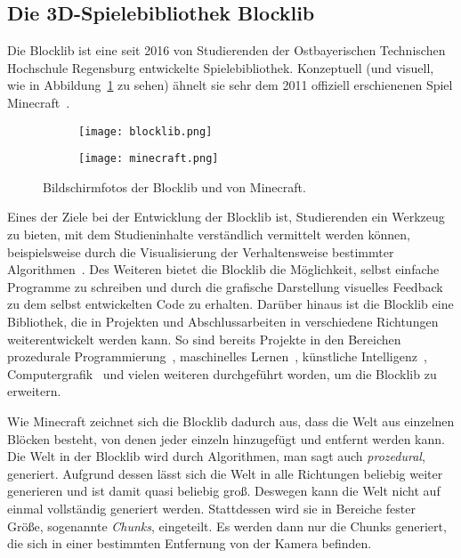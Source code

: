 \subsection{Die 3D-Spielebibliothek Blocklib}
Die Blocklib ist eine seit 2016 von Studierenden der Ostbayerischen Technischen Hochschule Regensburg entwickelte Spielebibliothek. Konzeptuell (und visuell, wie in Abbildung~\ref{fig:blocklibminecraft} zu sehen) ähnelt sie sehr dem 2011 offiziell erschienenen Spiel Minecraft~\cite{Mojang}.
\begin{figure}[!htbp]
	\begin{subfigure}[b]{.49\textwidth}
		\texttt{[image: blocklib.png]}
	\end{subfigure}
	\begin{subfigure}[b]{.49\textwidth}
		\texttt{[image: minecraft.png]}
	\end{subfigure}
	\caption{Bildschirmfotos der Blocklib und von Minecraft.}\label{fig:blocklibminecraft}
\end{figure}
Eines der Ziele bei der Entwicklung der Blocklib ist, Studierenden ein Werkzeug zu bieten, mit dem Studieninhalte verständlich vermittelt werden können, beispielsweise durch die Visualisierung der Verhaltensweise bestimmter Algorithmen~\cite{Helgert2018}. Des Weiteren bietet die Blocklib die Möglichkeit, selbst einfache Programme zu schreiben und durch die grafische Darstellung visuelles Feedback zu dem selbst entwickelten Code zu erhalten. Darüber hinaus ist die Blocklib eine Bibliothek, die in Projekten und Abschlussarbeiten in verschiedene Richtungen weiterentwickelt werden kann. So sind bereits Projekte in den Bereichen prozedurale Programmierung~\cite{Beer2017,Ebbinger2018a,Kalle2018,Sellner2020,Kohler2021}, maschinelles Lernen~\cite{Mayer2021}, künstliche Intelligenz~\cite{Amthor2017,Weidner2018,Bunke2021,Mayer2021}, Computergrafik~\cite{Zink2016,Ebbinger2018,Werner2018} und vielen weiteren durchgeführt worden, um die Blocklib zu erweitern.

Wie Minecraft zeichnet sich die Blocklib dadurch aus, dass die Welt aus einzelnen Blöcken besteht, von denen jeder einzeln hinzugefügt und entfernt werden kann. Die Welt in der Blocklib wird durch Algorithmen, man sagt auch \emph{prozedural}, generiert. Aufgrund dessen lässt sich die Welt in alle Richtungen beliebig weiter generieren und ist damit quasi beliebig groß. Deswegen kann die Welt nicht auf einmal vollständig generiert werden. Stattdessen wird sie in Bereiche fester Größe, sogenannte \emph{Chunks}, eingeteilt. Es werden dann nur die Chunks generiert, die sich in einer bestimmten Entfernung von der Kamera befinden.


